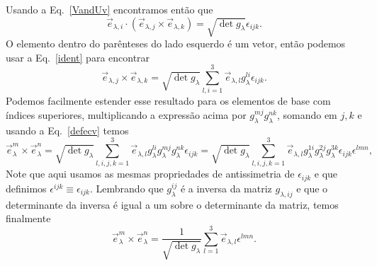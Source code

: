 Usando a Eq.~\eqref{VandUv}  encontramos então que
\begin{equation}
	\vec{e}_{\lambda,i}\cdot\left(\vec{e}_{\lambda,j}\times\vec{e}_{\lambda,k}\right) = \sqrt{\det g_{\lambda}}\epsilon_{ijk}.
\end{equation}
O elemento dentro do parênteses do lado esquerdo é um vetor, então podemos usar
a Eq.~\eqref{ident} para encontrar
\begin{equation}
	\vec{e}_{\lambda,j}\times\vec{e}_{\lambda,k} = \sqrt{\det g_{\lambda}}\sum_{l,i=1}^3\vec{e}_{\lambda,l}g_\lambda^{li}\epsilon_{ijk}.
\end{equation}
Podemos facilmente estender esse resultado para os elementos de base com índices
superiores, multiplicando a expressão acima por $g_\lambda^{mj}g_\lambda^{nk}$, somando em $j,k$ e usando a Eq.~\eqref{defecv} temos
\begin{equation}
	\vec{e}_{\lambda}^m\times\vec{e}_{\lambda}^n = \sqrt{\det g_{\lambda}}\sum_{l,i,j,k=1}^3\vec{e}_{\lambda,l}g_\lambda^{li}g_\lambda^{mj}g_\lambda^{nk}\epsilon_{ijk} = \sqrt{\det g_{\lambda}}\sum_{l,i,j,k=1}^3\vec{e}_{\lambda,l}g_\lambda^{1i}g_\lambda^{2j}g_\lambda^{3k}\epsilon_{ijk}\epsilon^{lmn}, %
\end{equation}
Note que aqui usamos as mesmas propriedades de antissimetria de $\epsilon_{ijk}$ e que definimos $\epsilon^{ijk} \equiv \epsilon_{ijk}$. Lembrando que $g_\lambda^{ij}$ é a inversa da matriz $g_{\lambda,ij}$ e que o determinante da inversa é igual a um sobre o determinante da matriz, temos finalmente
\begin{equation}\label{vecprodinv}
	\vec{e}_{\lambda}^m\times\vec{e}_{\lambda}^n = \frac{1}{\sqrt{\det g_{\lambda}}}\sum_{l=1}^3\vec{e}_{\lambda,l}\epsilon^{lmn}.
\end{equation}

